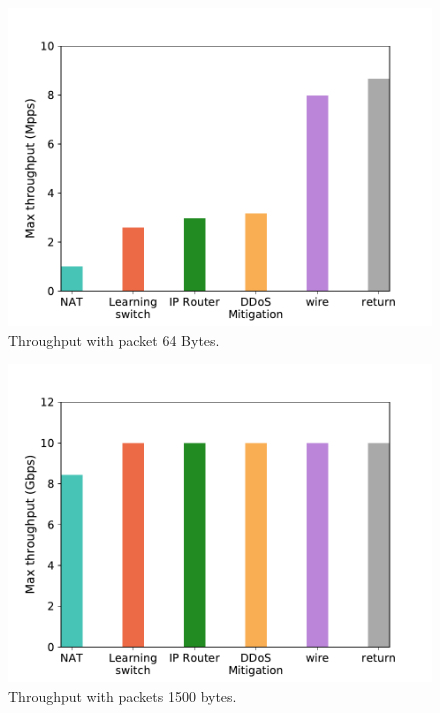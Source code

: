 \begin{figure}[ht]
\centering
\includegraphics[width=1.\linewidth]{figures/throughput_mpps_64B.pdf}
\caption{Throughput with packet 64 Bytes.}
\label{fig:throughput64}
\end{figure}

\begin{figure}[ht]
\centering
\includegraphics[width=1.\linewidth]{figures/throughput_gbps_1500B.pdf}
\caption{Throughput with packets 1500 bytes.}
\label{fig:throughput1500}
\end{figure}

